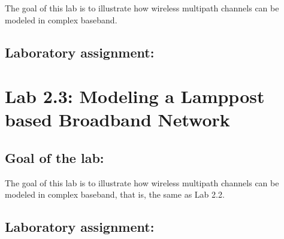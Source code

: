 \documentclass[a4paper,11pt]{article}
\begin{document}
The goal of this lab is to illustrate how wireless multipath channels can be
modeled in complex baseband.

\subsection{Laboratory assignment:}

\newpage

\section{Lab 2.3: Modeling a Lamppost based Broadband Network}

\subsection{Goal of the lab:}

The goal of this lab is to illustrate how wireless multipath channels can be
modeled in complex baseband, that is, the same as Lab 2.2.

\subsection{Laboratory assignment:}

\vspace{4cm}
\end{document}
